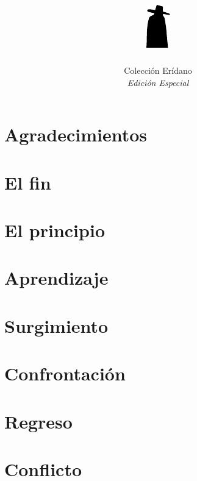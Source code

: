 \documentclass[11pt]{book}
\title{
    \vspace*{\stretch{.7}}
    \includegraphics{images/minicaido.pdf}\\
    \medskip
    \textbf{\Huge\titlename}
    \setcounter{page}{3}
}
\author{\textit{\authorname}}
\date{
    \vspace*{\stretch{1}}
    {\small Colección Erídano}\\
    \emph{\scriptsize Edición Especial}
}
\begin{document}
\pagestyle{empty}
\hbox{}\cleardoublepage
\maketitle


\chapter*{Agradecimientos}
\pagestyle{fancyplain}
\begin{small}
    
\end{small}

\chapter{El fin}


\chapter{El principio}


\chapter{Aprendizaje}


\chapter{Surgimiento}


\chapter{Confrontación}


\chapter{Regreso}


\chapter{Conflicto}

\end{document}
